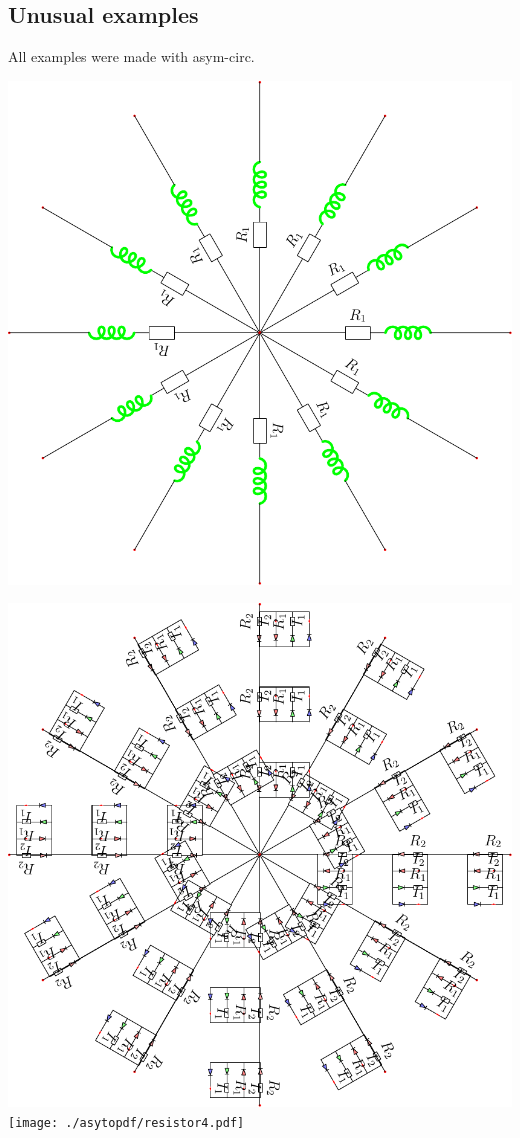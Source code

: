 \documentclass[10pt]{article}
\begin{document}


\subsection{Unusual examples}
All examples were made with asym-circ.\\
\begin{center}
\includegraphics[scale=.8]{./asytopdf/insolite0.pdf}
\end{center}

\includegraphics[scale=.5]{./asytopdf/insolite1.pdf}
\hfill\texttt{[image: ./asytopdf/resistor4.pdf]}
\end{document}
